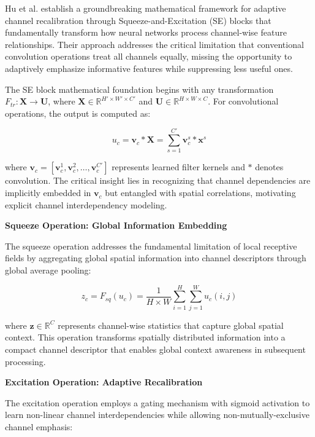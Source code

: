 \documentclass[journal]{IEEEtran}
\begin{document}
Hu et al. \cite{hu2018squeeze} establish a groundbreaking mathematical framework for adaptive channel recalibration through Squeeze-and-Excitation (SE) blocks that fundamentally transform how neural networks process channel-wise feature relationships. Their approach addresses the critical limitation that conventional convolution operations treat all channels equally, missing the opportunity to adaptively emphasize informative features while suppressing less useful ones.

The SE block mathematical foundation begins with any transformation $F_{tr}: \mathbf{X} \rightarrow \mathbf{U}$, where $\mathbf{X} \in \mathbb{R}^{H' \times W' \times C'}$ and $\mathbf{U} \in \mathbb{R}^{H \times W \times C}$. For convolutional operations, the output is computed as:

\begin{equation}
u_c = \mathbf{v}_c * \mathbf{X} = \sum_{s=1}^{C'} \mathbf{v}_c^s * \mathbf{x}^s
\label{eq:se_convolution}
\end{equation}

where $\mathbf{v}_c = [\mathbf{v}_c^1, \mathbf{v}_c^2, \ldots, \mathbf{v}_c^{C'}]$ represents learned filter kernels and $*$ denotes convolution. The critical insight lies in recognizing that channel dependencies are implicitly embedded in $\mathbf{v}_c$ but entangled with spatial correlations, motivating explicit channel interdependency modeling.

\textbf{Squeeze Operation: Global Information Embedding}

The squeeze operation addresses the fundamental limitation of local receptive fields by aggregating global spatial information into channel descriptors through global average pooling:

\begin{equation}
z_c = F_{sq}(u_c) = \frac{1}{H \times W} \sum_{i=1}^{H} \sum_{j=1}^{W} u_c(i,j)
\label{eq:se_squeeze}
\end{equation}

where $\mathbf{z} \in \mathbb{R}^C$ represents channel-wise statistics that capture global spatial context. This operation transforms spatially distributed information into a compact channel descriptor that enables global context awareness in subsequent processing.

\textbf{Excitation Operation: Adaptive Recalibration}

The excitation operation employs a gating mechanism with sigmoid activation to learn non-linear channel interdependencies while allowing non-mutually-exclusive channel emphasis:
\end{document}
